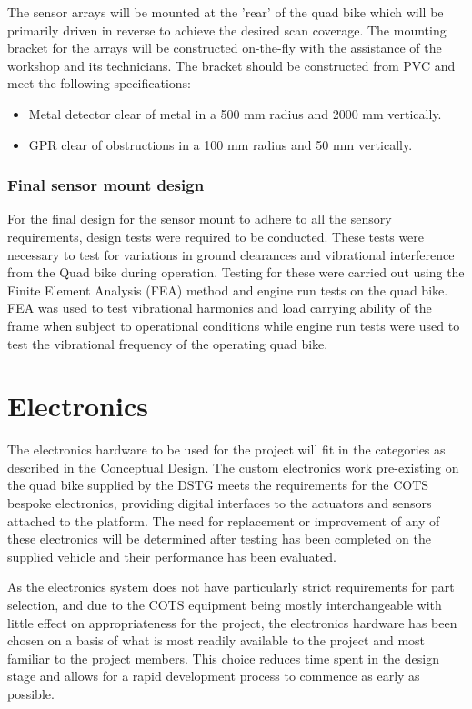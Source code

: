 \documentclass[main.tex]{subfiles}
\begin{document}
The sensor arrays will be mounted at the 'rear' of the quad bike which will be primarily driven in reverse to achieve the desired scan coverage. The mounting bracket for the arrays will be constructed on-the-fly with the assistance of the workshop and its technicians. The bracket should be constructed from PVC and meet the following specifications:
\begin{itemize}
\item Metal detector clear of metal in a 500 mm radius and 2000 mm vertically.
\item GPR clear of obstructions in a 100 mm radius and 50 mm vertically.
\end{itemize}

\subsubsection{Final sensor mount design}
For the final design for the sensor mount to adhere to all the sensory requirements, design tests were required to be conducted. These tests were necessary to test for variations in ground clearances and vibrational interference from the Quad bike during operation. Testing for these were carried out using the Finite Element Analysis (FEA) method and engine run tests on the quad bike. FEA was used to test vibrational harmonics and load carrying ability of the frame when subject to operational conditions while engine run tests were used to test the vibrational frequency of the operating quad bike. 

\section{Electronics}
The electronics hardware to be used for the project will fit in the categories as described in the Conceptual Design. The custom electronics work pre-existing on the quad bike supplied by the DSTG meets the requirements for the COTS bespoke electronics, providing digital interfaces to the actuators and sensors attached to the platform. The need for replacement or improvement of any of these electronics will be determined after testing has been completed on the supplied vehicle and their performance has been evaluated.

As the electronics system does not have particularly strict requirements for part selection, and due to the COTS equipment being mostly interchangeable with little effect on appropriateness for the project, the electronics hardware has been chosen on a basis of what is most readily available to the project and most familiar to the project members. This choice reduces time spent in the design stage and allows for a rapid development process to commence as early as possible.
\end{document}
